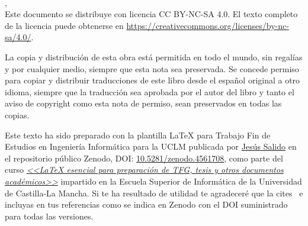 %
%


\ifspanish
\else
\fi
\null\vspace{6cm}
\makeatletter
{\small \noindent \@tituloCorto\\
\textcopyright{} \@autor, \@yearTF\\[1cm]
Este documento se distribuye con licencia CC BY-NC-SA 4.0. El texto completo de la licencia puede obtenerse en \url{https://creativecommons.org/licenses/by-nc-sa/4.0/}.
\makeatother

La copia y distribución de esta obra está permitida en todo el mundo, sin regalías y por cualquier medio, siempre que esta nota sea preservada. Se concede permiso para copiar y distribuir traducciones de este libro desde el español original a otro idioma, siempre que la traducción sea aprobada por el autor del libro y tanto el aviso de copyright como esta nota de permiso, sean preservados en todas las copias.


\vfill
Este texto ha sido preparado con la plantilla \LaTeX{} para Trabajo Fin de Estudios en Ingeniería Informática para la UCLM publicada por \href{https://www.esi.uclm.es/www/jsalido}{Jesús Salido} en el repositorio público Zenodo, DOI: \href{https://doi.org/10.5281/zenodo.4561708}{10.5281/zenodo.4561708}, como parte del curso \href{http://visilab.etsii.uclm.es/?page_id=1468}{\emph{<<\LaTeX{} esencial para preparación de TFG, tesis y otros documentos académicos>>}} impartido en la Escuela Superior de Informática de la Universidad de Castilla-La Mancha. Si te ha resultado de utilidad te agradeceré que la cites~\cite{salido19} e incluyas en tus referencias como se indica en Zenodo con el DOI suministrado para todas las versiones.}

